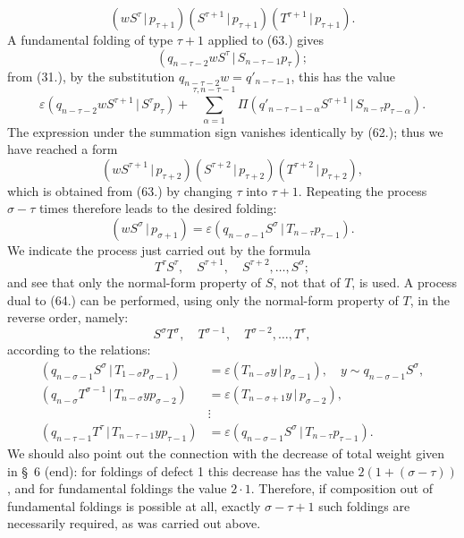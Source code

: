 \documentclass[11pt]{article}
\newcommand{\pair}[2]{(#1\,|\,#2)}
\newcommand{\eps}{\varepsilon}
\begin{document}
\begin{equation}
 \pair{wS^\tau}{p_{\tau+1}}\pair{S^{\tau+1}}{p_{\tau+1}}\pair{T^{\tau+1}}{p_{\tau+1}}.
\tag{63}
\end{equation}
A fundamental folding of type $\tau+1$ applied to (63.) gives
\[
 \pair{q_{n-\tau-2}wS^\tau}{S_{n-\tau-1}p_\tau};
\]
from (31.), by the substitution $q_{n-\tau-2}w=q'_{n-\tau-1}$, this has the value
\[
 \eps\pair{q_{n-\tau-2}wS^{\tau+1}}{S^\tau p_\tau}
 +\sum_{\alpha=1}^{\tau,n-\tau-1}\Pi\pair{q'_{n-\tau-1-\alpha}S^{\tau+1}}{S_{n-\tau}p_{\tau-\alpha}}.
\]
The expression under the summation sign vanishes identically by (62.); thus we have reached a form
\[
 \pair{wS^{\tau+1}}{p_{\tau+2}}\pair{S^{\tau+2}}{p_{\tau+2}}\pair{T^{\tau+2}}{p_{\tau+2}},
\]
which is obtained from (63.) by changing $\tau$ into $\tau+1$. Repeating the process $\sigma-\tau$ times therefore leads to the desired folding:
\[
 \pair{wS^\sigma}{p_{\sigma+1}}=\eps\pair{q_{n-\sigma-1}S^\sigma}{T_{n-\tau}p_{\tau-1}}.
\]
We indicate the process just carried out by the formula
\begin{equation}
 T^\tau S^\tau,
\quad S^{\tau+1},\quad S^{\tau+2},\ldots,S^\sigma;
\tag{64}
\end{equation}
and see that only the normal-form property of $S$, not that of $T$, is used. A process dual to (64.) can be performed, using only the normal-form property of $T$, in the reverse order, namely:
\begin{equation}
 S^\sigma T^\sigma,
\quad T^{\sigma-1},\quad T^{\sigma-2},\ldots,T^\tau,
\tag{65}
\end{equation}
according to the relations:
\begin{align*}
\pair{q_{n-\sigma-1}S^\sigma}{T_{1-\sigma}p_{\sigma-1}}&=\eps\pair{T_{n-\sigma}y}{p_{\sigma-1}},\quad y\sim q_{n-\sigma-1}S^\sigma,\\
\pair{q_{n-\sigma}T^{\sigma-1}}{T_{n-\sigma}yp_{\sigma-2}}&=\eps\pair{T_{n-\sigma+1}y}{p_{\sigma-2}},\\
&\vdots\\
\pair{q_{n-\tau-1}T^\tau}{T_{n-\tau-1}yp_{\tau-1}}&=\eps\pair{q_{n-\sigma-1}S^\sigma}{T_{n-\tau}p_{\tau-1}}.
\end{align*}
We should also point out the connection with the decrease of total weight given in \S\ 6 (end): for foldings of defect 1 this decrease has the value $2(1+(\sigma-\tau))$, and for fundamental foldings the value $2\cdot1$. Therefore, if composition out of fundamental foldings is possible at all, exactly $\sigma-\tau+1$ such foldings are necessarily required, as was carried out above.
\end{document}

